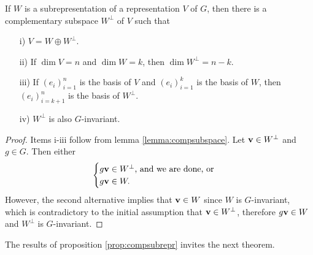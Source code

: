 		\begin{proposition}\cite[Prop.1.5]{FultonHarris}\label{prop:compsubrepr}
			If $W$ is a subrepresentation of a representation $V$ of $G$, then there is a complementary subspace $W^\perp$ of $V$ such that 
			\begin{enumerate}
				
				\item[i)] $V = W \oplus W^\perp$.
				
				\item[ii)] If $\dim V = n$ and $\dim W = k$, then $\dim W^\perp = n-k$.
				
				\item[iii)] If $(e_i)_{i=1}^n$ is the basis of $V$ and $(e_i)_{i=1}^k$ is the basis of $W$, then $(e_i)_{i=k+1}^n$ is the basis of $W^\perp$.
				
				\item[iv)] $W^\perp$ is also $G$-invariant.
				
			\end{enumerate}
		\end{proposition}
		\begin{proof}
			Items i-iii follow from lemma \ref{lemma:compsubspace}. Let $\mathbf{v} \in W^\perp$ and $g \in G$. Then either
			\[
			\begin{cases}
				g\mathbf{v} \in W^\perp \text{, and we are done, or }\\
				g\mathbf{v} \in W.
			\end{cases}
			\]
			However, the second alternative implies that $\mathbf{v} \in W$ since $W$ is $G$-invariant, which is contradictory to the initial assumption that $\mathbf{v} \in W^\perp$, therefore $g\mathbf{v} \in W$ and $W^\perp$ is $G$-invariant.
		\end{proof}
		
		The results of proposition \ref{prop:compsubrepr} invites the next theorem.
		
